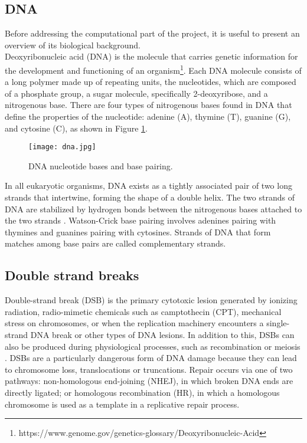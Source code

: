 \subsection{DNA}

Before addressing the computational part of the project, it is useful to present an overview of its biological background. \\
Deoxyribonucleic acid (DNA) is the molecule that carries genetic information for the development and functioning of an organism\footnote{https://www.genome.gov/genetics-glossary/Deoxyribonucleic-Acid}. Each DNA molecule consists of a long polymer made up of repeating units, the nucleotides, which are composed of a phosphate group, a sugar molecule, specifically 2-deoxyribose, and a nitrogenous base. There are four types of nitrogenous bases found in DNA that define the properties of the nucleotide: adenine (A), thymine (T), guanine (G), and cytosine (C), as shown in Figure \ref{fig:dna}.\\

\begin{figure}[h]

  \centering
    \texttt{[image: dna.jpg]}

  \caption{DNA nucleotide bases and base pairing.}
  \label{fig:dna}
\end{figure}

In all eukaryotic organisms, DNA exists as a tightly associated pair of two long strands that intertwine, forming the shape of a double helix. The two strands of DNA are stabilized by hydrogen bonds between the nitrogenous bases attached to the two strands \cite{carter_chapter_2022}. Watson-Crick base pairing involves adenines pairing with thymines and guanines pairing with cytosines. Strands of DNA that form matches among base pairs are called complementary strands. \\

\subsection{Double strand breaks}

Double-strand break (DSB) is the primary cytotoxic lesion generated by ionizing radiation, radio-mimetic chemicals such as camptothecin (CPT), mechanical stress on chromosomes, or when the replication machinery encounters a single-strand DNA break or other types of DNA lesions. In addition to this, DSBs can also be produced during physiological processes, such as recombination or meiosis \cite{ting_rad18_2010}.
DSBs are a particularly dangerous form of DNA damage because they can lead to chromosome loss, translocations or truncations. Repair occurs via one of two pathways: non-homologous end-joining (NHEJ), in which broken DNA ends are directly ligated; or homologous recombination (HR), in which a homologous chromosome is used as a template in a replicative repair process. 

